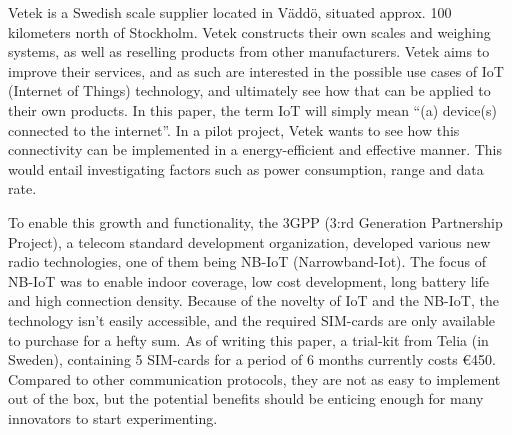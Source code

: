 


Vetek is a Swedish scale supplier located in Väddö, situated approx. 100 kilometers north of Stockholm. Vetek constructs their own scales and weighing systems, as well as reselling products from other manufacturers.\cite{vetek} Vetek aims to improve their services, and as such are interested in the possible use cases of IoT (Internet of Things) technology, and ultimately see how that can be applied to their own products. In this paper, the term IoT will simply mean ``(a) device(s) connected to the internet''\cite{what_is_iot}. In a pilot project, Vetek wants to see how this connectivity can be implemented in a energy-efficient and effective manner. This would entail investigating factors such as power consumption, range and data rate. 


To enable this growth and functionality, the 3GPP (3:rd Generation Partnership Project), a telecom standard development organization\cite{3gpp}, developed various new radio technologies, one of them being NB-IoT (Narrowband-Iot). The focus of NB-IoT was to enable indoor coverage, low cost development, long battery life and high connection density. Because of the novelty of IoT and the NB-IoT, the technology isn't easily accessible, and the required SIM-cards are only available to purchase for a hefty sum. As of writing this paper, a trial-kit from Telia (in Sweden), containing 5 SIM-cards for a period of 6 months currently costs €450.\cite{telia-nb}  Compared to other communication protocols, they are not as easy to implement out of the box, but the potential benefits should be enticing enough for many innovators to start experimenting.

